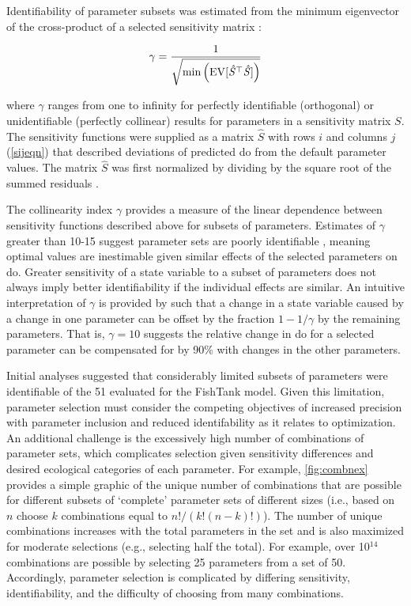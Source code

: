 \documentclass[letterpaper,12pt,oneside]{article}\usepackage[]{graphicx}\usepackage[]{color}
\begin{document}
Identifiability of parameter subsets was estimated from the minimum eigenvector of the cross-product of a selected sensitivity matrix \citep{Brun01,Omlin01}:

\begin{equation} \label{gameq}
\gamma = \frac{1} {\sqrt{ \min \left(\rm{EV}[\mathit{\hat{S}}^\top \mathit{\hat{S}}]\right)}}
\end{equation}

\noindent where $\gamma$ ranges from one to infinity for perfectly identifiable (orthogonal) or unidentifiable (perfectly collinear) results for parameters in a sensitivity matrix $S$.  The sensitivity functions were supplied as a matrix $\hat{S}$ with rows $i$ and columns $j$ (\cref{sijeqn}) that described deviations of predicted \ac{do} from the default parameter values.  The matrix $\hat{S}$ was first normalized by dividing by the square root of the summed residuals \citep{Omlin01,Soetaert10}. 

The collinearity index $\gamma$ provides a measure of the linear dependence between sensitivity functions described above for subsets of parameters. Estimates of $\gamma$ greater than 10-15 suggest parameter sets are poorly identifiable \citep{Brun01,Omlin01}, meaning optimal values are inestimable given similar effects of the selected parameters on \ac{do}. Greater sensitivity of a state variable to a subset of parameters does not always imply better identifiability if the individual effects are similar.  An intuitive interpretation of $\gamma$ is provided by \citet{Brun01} such that a change in a state variable caused by a change in one parameter can be offset by the fraction $1 - 1/\gamma$ by the remaining parameters.  That is, $\gamma = 10$ suggests the relative change in \ac{do} for a selected parameter can be compensated for by 90\% with changes in the other parameters. 

Initial analyses suggested that considerably limited subsets of parameters were identifiable of the 51 evaluated for the FishTank model.  Given this limitation, parameter selection must consider the competing objectives of increased precision with parameter inclusion and reduced identifability as it relates to optimization.  An additional challenge is the excessively high number of combinations of parameter sets, which complicates selection given sensitivity differences and desired ecological categories of each parameter.  For example, \cref{fig:combnex} provides a simple graphic of the unique number of combinations that are possible for different subsets of `complete' parameter sets of different sizes (i.e., based on $n$ choose $k$ combinations equal to $n!/\left(k!\left(n-k\right)!\right)$).  The number of unique combinations increases with the total parameters in the set and is also maximized for moderate selections (e.g., selecting half the total).  For example, over 10$^{14}$ combinations are possible by selecting 25 parameters from a set of 50.  Accordingly, parameter selection is complicated by differing sensitivity, identifiability, and the difficulty of choosing from many combinations.
\end{document}
